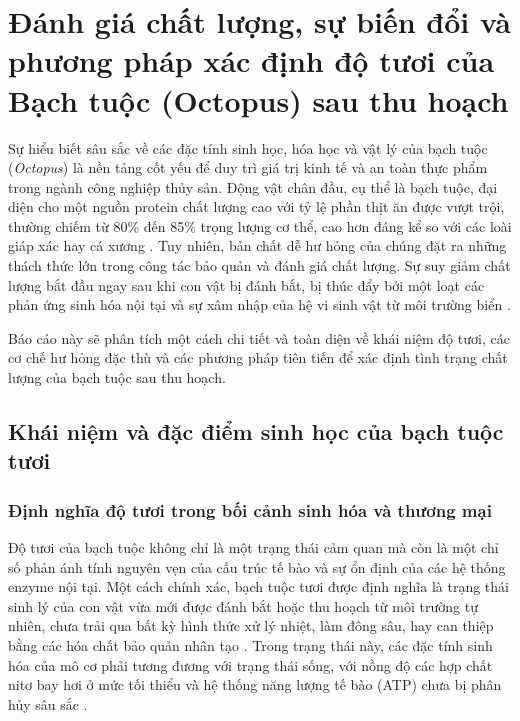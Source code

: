\documentclass[12pt,a4paper]{report}
\begin{document}
\setcounter{page}{1} 

\chapter{Đánh giá chất lượng, sự biến đổi và phương pháp xác định độ tươi của Bạch tuộc (Octopus) sau thu hoạch}

Sự hiểu biết sâu sắc về các đặc tính sinh học, hóa học và vật lý của bạch tuộc (\textit{Octopus}) là nền tảng cốt yếu để duy trì giá trị kinh tế và an toàn thực phẩm trong ngành công nghiệp thủy sản. Động vật chân đầu, cụ thể là bạch tuộc, đại diện cho một nguồn protein chất lượng cao với tỷ lệ phần thịt ăn được vượt trội, thường chiếm từ 80\% đến 85\% trọng lượng cơ thể, cao hơn đáng kể so với các loài giáp xác hay cá xương \cite{pubmed_ice_storage}. Tuy nhiên, bản chất dễ hư hỏng của chúng đặt ra những thách thức lớn trong công tác bảo quản và đánh giá chất lượng. Sự suy giảm chất lượng bắt đầu ngay sau khi con vật bị đánh bắt, bị thúc đẩy bởi một loạt các phản ứng sinh hóa nội tại và sự xâm nhập của hệ vi sinh vật từ môi trường biển \cite{mdpi_fish_spoilage}. 

Báo cáo này sẽ phân tích một cách chi tiết và toàn diện về khái niệm độ tươi, các cơ chế hư hỏng đặc thù và các phương pháp tiên tiến để xác định tình trạng chất lượng của bạch tuộc sau thu hoạch.

\section{Khái niệm và đặc điểm sinh học của bạch tuộc tươi}

\subsection{Định nghĩa độ tươi trong bối cảnh sinh hóa và thương mại}

Độ tươi của bạch tuộc không chỉ là một trạng thái cảm quan mà còn là một chỉ số phản ánh tính nguyên vẹn của cấu trúc tế bào và sự ổn định của các hệ thống enzyme nội tại. Một cách chính xác, bạch tuộc tươi được định nghĩa là trạng thái sinh lý của con vật vừa mới được đánh bắt hoặc thu hoạch từ môi trường tự nhiên, chưa trải qua bất kỳ hình thức xử lý nhiệt, làm đông sâu, hay can thiệp bằng các hóa chất bảo quản nhân tạo \cite{tcvn_7265}. Trong trạng thái này, các đặc tính sinh hóa của mô cơ phải tương đương với trạng thái sống, với nồng độ các hợp chất nitơ bay hơi ở mức tối thiểu và hệ thống năng lượng tế bào (ATP) chưa bị phân hủy sâu sắc \cite{researchgate_squid_freshness}.
\end{document}
